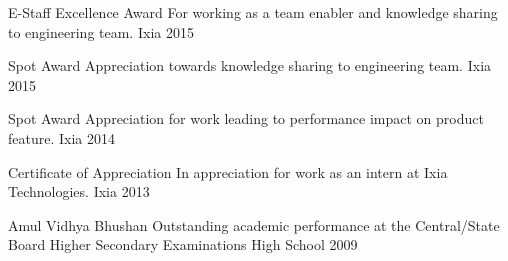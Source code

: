 



\begin{cvhonors}
	
	\cvhonor
	{E-Staff Excellence Award} %
	{For working as a team enabler and knowledge sharing to engineering team.} %
	{Ixia} %
	{2015} %
	
	\cvhonor
	{Spot Award} %
	{Appreciation towards knowledge sharing to engineering team.} %
	{Ixia} %
	{2015} %
	
	\cvhonor
	{Spot Award} %
	{Appreciation for work leading to performance impact on product feature.} %
	{Ixia} %
	{2014} %
	
	\cvhonor
	{Certificate of Appreciation} %
	{In appreciation for work as an intern at Ixia Technologies.} %
	{Ixia} %
	{2013} %
	
	\cvhonor
	{Amul Vidhya Bhushan} %
	{Outstanding academic performance at the Central/State Board Higher Secondary Examinations} %
	{High School} %
	{2009} %
	
\end{cvhonors}


